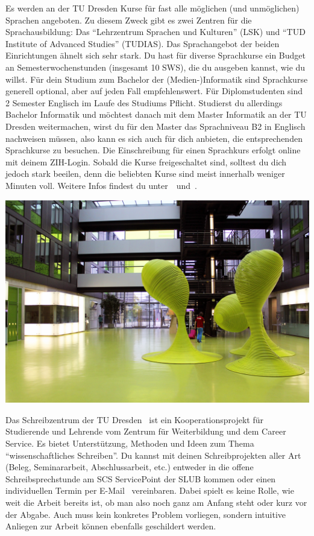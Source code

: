 Es werden an der TU Dresden Kurse für fast alle möglichen (und unmöglichen) Sprachen angeboten.
Zu diesem Zweck gibt es zwei Zentren für die Sprachausbildung: Das \enquote{Lehrzentrum Sprachen und Kulturen} (LSK) und \enquote{TUD Institute of Advanced Studies} (TUDIAS).
Das Sprachangebot der beiden Einrichtungen ähnelt sich sehr stark.
Du hast für diverse Sprachkurse ein Budget an Semesterwochenstunden (insgesamt 10 SWS), die du ausgeben kannst, wie du willst.
Für dein Studium zum Bachelor der (Medien-)Informatik sind Sprachkurse generell optional, aber auf jeden Fall empfehlenswert.
Für Diplomstudenten sind 2 Semester Englisch im Laufe des Studiums Pflicht.
Studierst du allerdings Bachelor Informatik und möchtest danach mit dem Master Informatik an der TU Dresden weitermachen, wirst du für den Master das Sprachniveau B2 in Englisch nachweisen müssen,
also kann es sich auch für dich anbieten, die entsprechenden Sprachkurse zu besuchen.
Die Einschreibung für einen Sprachkurs erfolgt online~ mit deinem ZIH-Login.
Sobald die Kurse freigeschaltet sind, solltest du dich jedoch stark beeilen, denn die beliebten Kurse sind meist innerhalb weniger Minuten voll.
Weitere Infos findest du unter~~und~.

\vfill
\begin{center}
  \includegraphics[trim={0 4cm 0 0}, clip, width=\linewidth]{img/ese2013/foyer.jpg}
\end{center}

Das Schreibzentrum der TU Dresden~ ist ein Kooperationsprojekt für Studierende und Lehrende vom Zentrum für Weiterbildung und dem Career Service. Es bietet Unterstützung, Methoden und Ideen zum Thema \enquote{wissenschaftliches Schreiben}.
Du kannst mit deinen Schreibprojekten aller Art (Beleg, Seminararbeit, Abschlussarbeit, etc.) entweder in die offene Schreibsprechstunde am SCS ServicePoint der SLUB kommen oder einen individuellen Termin per E-Mail~ vereinbaren.
Dabei spielt es keine Rolle, wie weit die Arbeit bereits ist, ob man also noch ganz am Anfang steht oder kurz vor der Abgabe.
Auch muss kein konkretes Problem vorliegen, sondern intuitive Anliegen zur Arbeit können ebenfalls geschildert werden.

